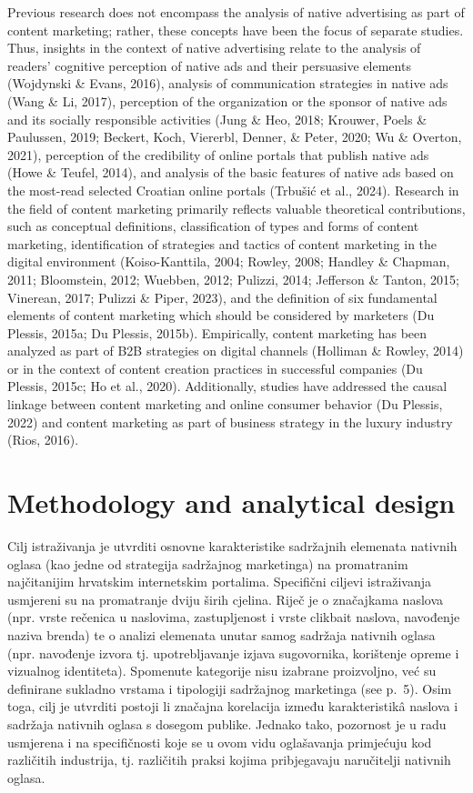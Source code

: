 \documentclass[preprint, 3p,
authoryear]{elsarticle} %
\begin{document}
Previous research does not encompass the analysis of native advertising
as part of content marketing; rather, these concepts have been the focus
of separate studies. Thus, insights in the context of native advertising
relate to the analysis of readers' cognitive perception of native ads
and their persuasive elements (Wojdynski \& Evans, 2016), analysis of
communication strategies in native ads (Wang \& Li, 2017), perception of
the organization or the sponsor of native ads and its socially
responsible activities (Jung \& Heo, 2018; Krouwer, Poels \& Paulussen,
2019; Beckert, Koch, Viererbl, Denner, \& Peter, 2020; Wu \& Overton,
2021), perception of the credibility of online portals that publish
native ads (Howe \& Teufel, 2014), and analysis of the basic features of
native ads based on the most-read selected Croatian online portals
(Trbušić et al., 2024). Research in the field of content marketing
primarily reflects valuable theoretical contributions, such as
conceptual definitions, classification of types and forms of content
marketing, identification of strategies and tactics of content marketing
in the digital environment (Koiso-Kanttila, 2004; Rowley, 2008; Handley
\& Chapman, 2011; Bloomstein, 2012; Wuebben, 2012; Pulizzi, 2014;
Jefferson \& Tanton, 2015; Vinerean, 2017; Pulizzi \& Piper, 2023), and
the definition of six fundamental elements of content marketing which
should be considered by marketers (Du Plessis, 2015a; Du Plessis,
2015b). Empirically, content marketing has been analyzed as part of B2B
strategies on digital channels (Holliman \& Rowley, 2014) or in the
context of content creation practices in successful companies (Du
Plessis, 2015c; Ho et al., 2020). Additionally, studies have addressed
the causal linkage between content marketing and online consumer
behavior (Du Plessis, 2022) and content marketing as part of business
strategy in the luxury industry (Rios, 2016).

\hypertarget{methodology-and-analytical-design}{%
\section{Methodology and analytical
design}\label{methodology-and-analytical-design}}

Cilj istraživanja je utvrditi osnovne karakteristike sadržajnih
elemenata nativnih oglasa (kao jedne od strategija sadržajnog
marketinga) na promatranim najčitanijim hrvatskim internetskim
portalima. Specifični ciljevi istraživanja usmjereni su na promatranje
dviju širih cjelina. Riječ je o značajkama naslova (npr. vrste rečenica
u naslovima, zastupljenost i vrste clikbait naslova, navođenje naziva
brenda) te o analizi elemenata unutar samog sadržaja nativnih oglasa
(npr. navođenje izvora tj. upotrebljavanje izjava sugovornika,
korištenje opreme i vizualnog identiteta). Spomenute kategorije nisu
izabrane proizvoljno, već su definirane sukladno vrstama i tipologiji
sadržajnog marketinga (see p.~5). Osim toga, cilj je utvrditi postoji li
značajna korelacija između karakteristikâ naslova i sadržaja nativnih
oglasa s dosegom publike. Jednako tako, pozornost je u radu usmjerena i
na specifičnosti koje se u ovom vidu oglašavanja primjećuju kod
različitih industrija, tj. različitih praksi kojima pribjegavaju
naručitelji nativnih oglasa.
\end{document}
